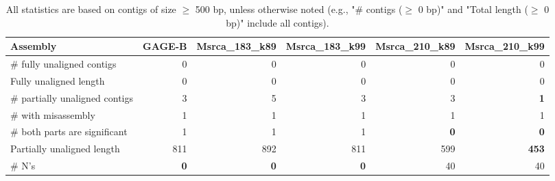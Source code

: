 \documentclass[12pt,a4paper]{article}
\begin{document}
\begin{table}[ht]
\begin{center}
\caption{All statistics are based on contigs of size $\geq$ 500 bp, unless otherwise noted (e.g., "\# contigs ($\geq$ 0 bp)" and "Total length ($\geq$ 0 bp)" include all contigs).}
\begin{tabular}{|l*{5}{|r}|}
\hline
Assembly & GAGE-B & Msrca\_183\_k89 & Msrca\_183\_k99 & Msrca\_210\_k89 & Msrca\_210\_k99 \\ \hline
\# fully unaligned contigs & 0 & 0 & 0 & 0 & 0 \\ \hline
Fully unaligned length & 0 & 0 & 0 & 0 & 0 \\ \hline
\# partially unaligned contigs & 3 & 5 & 3 & 3 & {\bf 1} \\ \hline
\hspace{5mm}\# with misassembly & 1 & 1 & 1 & 1 & 1 \\ \hline
\hspace{5mm}\# both parts are significant & 1 & 1 & 1 & {\bf 0} & {\bf 0} \\ \hline
Partially unaligned length & 811 & 892 & 811 & 599 & {\bf 453} \\ \hline
\# N's & {\bf 0} & {\bf 0} & {\bf 0} & 40 & 40 \\ \hline
\end{tabular}
\end{center}
\end{table}
\end{document}
